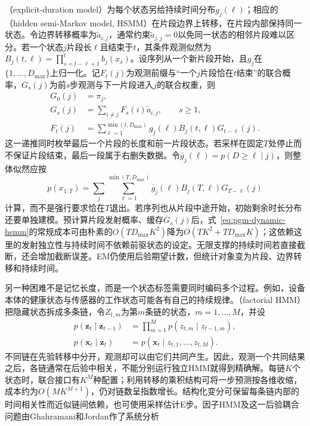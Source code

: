 （explicit-duration model）为每个状态另给持续时间分布$g_j(\ell)$；相应的（hidden semi-Markov model, HSMM）在片段边界上转移，在片段内部保持同一状态。令边界转移概率为$\widetilde a_{i,j}$，通常约束$\widetilde a_{j,j}=0$以免同一状态的相邻片段难以区分。若一个状态$j$片段长$\ell$且结束于$t$，其条件观测似然为$B_j(t,\ell)=\prod_{s=t-\ell+1}^{t}b_j(x_s)$。设序列从一个新片段开始，且$g_j$在$\{1,\ldots,D_{\max}\}$上归一化。记$F_t(j)$为观测前缀与“一个$j$片段恰在$t$结束”的联合概率，$G_s(j)$为前$s$步观测与下一片段进入$j$的联合权重，则
\begin{equation}
  \begin{aligned}
    G_0(j)&=\pi_j,\\
    G_s(j)&=\sum_{i\ne j}
      F_s(i)\widetilde a_{i,j},\qquad s\geq1,\\
    F_t(j)&=\sum_{\ell=1}^{\min(t,D_{\max})}
      g_j(\ell)B_j(t,\ell)G_{t-\ell}(j).
  \end{aligned}
  \label{eq:pgm-dynamic-hsmm}
\end{equation}
这一递推同时枚举最后一个片段的长度和前一片段状态。若采样在固定$T$处停止而不保证片段结束，最后一段属于右删失数据。令$\overline g_j(\ell)=p(D\geq\ell\mid j)$，则整体似然应按
\[
  p(x_{1:T})=\sum_j\sum_{\ell=1}^{\min(T,D_{\max})}
    \overline g_j(\ell)B_j(T,\ell)G_{T-\ell}(j)
\]
计算，而不是强行要求恰在$T$退出。若序列也从片段中途开始，初始剩余时长分布还要单独建模。预计算片段发射概率、缓存$G_s(j)$后，式~\eqref{eq:pgm-dynamic-hsmm}的常规成本可由朴素的$O(TD_{\max}K^2)$降为$O(TK^2+TD_{\max}K)$；这依赖这里的发射独立性与持续时间不依赖前驱状态的设定。无限支撑的持续时间若直接截断，还会增加截断误差。EM仍使用后验期望计数，但统计对象变为片段、边界转移和持续时间。

另一种困难不是记忆长度，而是一个状态标签需要同时编码多个过程。例如，设备本体的健康状态与传感器的工作状态可能各有自己的持续规律。（factorial HMM）把隐藏状态拆成多条链，令$Z_{t,m}$为第$m$条链的状态，$m=1,\ldots,M$，并设
\begin{equation}
  \begin{aligned}
    p(\bm{z}_t\mid\bm{z}_{t-1})
      &=\prod_{m=1}^{M}
        p(z_{t,m}\mid z_{t-1,m}),\\
    p(\bm{x}_t\mid\bm{z}_t)
      &=p(\bm{x}_t\mid z_{t,1},\ldots,z_{t,M}).
  \end{aligned}
  \label{eq:pgm-dynamic-factorial}
\end{equation}
不同链在先验转移中分开，观测却可以由它们共同产生。因此，观测一个共同结果之后，各链通常在后验中相关，不能分别运行独立HMM就得到精确解。每链$K$个状态时，联合接口有$K^M$种配置；利用转移的乘积结构可将一步预测按各维收缩，成本约为$O(MK^{M+1})$，仍对链数呈指数增长。结构化变分可保留每条链内部的时间相关性而近似链间依赖，也可使用采样估计E步。因子HMM及这一后验耦合问题由Ghahramani和Jordan作了系统分析

